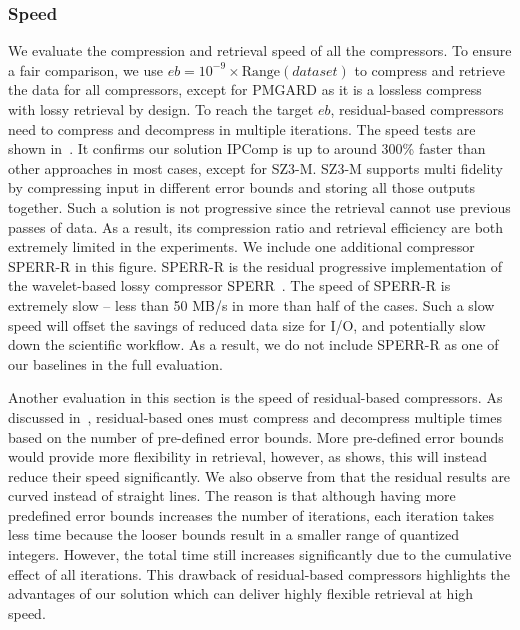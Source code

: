 \subsubsection{Speed}

We evaluate the compression and retrieval speed of all the compressors. To ensure a fair comparison, we use $eb=10^{-9} \times \text{Range}(dataset)$ to compress and retrieve the data for all compressors, except for PMGARD as it is a lossless compress with lossy retrieval by design. To reach the target $eb$, residual-based compressors need to compress and decompress in multiple iterations.
The speed tests are shown in~. It confirms our solution IPComp is up to around 300\% faster than other approaches in most cases, except for SZ3-M. SZ3-M supports multi fidelity by compressing input in different error bounds and storing all those outputs together. Such a solution is not progressive since the retrieval cannot use previous passes of data. As a result, its compression ratio and retrieval efficiency are both extremely limited in the experiments.
We include one additional compressor SPERR-R in this figure. SPERR-R is the residual progressive implementation of the wavelet-based lossy compressor SPERR~\cite{sperr}. The speed of SPERR-R is extremely slow -- less than 50 MB/s in more than half of the cases. Such a slow speed will offset the savings of reduced data size for I/O, and potentially slow down the scientific workflow. As a result, we do not include SPERR-R as one of our baselines in the full evaluation.



Another evaluation in this section is the speed of residual-based compressors. As discussed in~, residual-based ones must compress and decompress multiple times based on the number of pre-defined error bounds. More pre-defined error bounds would provide more flexibility in retrieval, however, as  shows, this will instead reduce their speed significantly. We also observe from  that the residual results are curved instead of straight lines. The reason is that although having more predefined error bounds increases the number of iterations, each iteration takes less time because the looser bounds result in a smaller range of quantized integers. However, the total time still increases significantly due to the cumulative effect of all iterations.
This drawback of residual-based compressors highlights the advantages of our solution which can deliver highly flexible retrieval at high speed.

